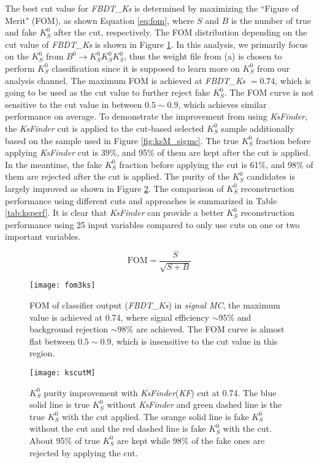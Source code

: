 The best cut value for \textit{FBDT\_Ks} is determined by maximizing the ``Figure of Merit" (FOM), as shown Equation \ref{eq:fom}, where $S$ and $B$ is the number of true and fake $K_S^0$ after the cut, respectively. The FOM distribution depending on the cut value of \textit{FBDT\_Ks} is shown in Figure \ref{fig:ks_fom}. In this analysis, we primarily focus on the $K_S^0$ from $B^0 \to K_S^0  K_S^0  K_S^0$, thus the weight file from (a) is chosen to perform $K_S^0$ classification since it is supposed to learn more on $K_S^0$ from our analysis channel. The maximum FOM is achieved at \textit{FBDT\_Ks} $= 0.74$, which is going to be used as the cut value to further reject fake $K_S^0$. The FOM curve is not sensitive to the cut value in between $0.5 \sim 0.9$, which achieves similar performance on average. To demonstrate the improvement from using \textit{KsFinder}, the \textit{KsFinder} cut is applied to the cut-based selected $K_S^0$ sample additionally based on the sample used in Figure \ref{fig:ksM_sigmc}.  The true $K_S^0$ fraction before applying \textit{KsFinder} cut is 39\%, and 95\% of them are kept after the cut is applied. In the meantime, the fake $K_S^0$ fraction before applying the cut is 61\%, and 98\% of them are rejected after the cut is applied. The purity of the $K_S^0$ candidates is largely improved as shown in Figure \ref{fig:ks_cutused}. The comparison of $K_S^0$ reconstruction performance using different cuts and approaches is summarized in Table \ref{tab:ksperf}.  It is clear that \textit{KsFinder} can provide a better $K_S^0$ reconstruction performance using 25 input variables compared to only use cuts on one or two important variables.

\begin{equation}\label{eq:fom}
	\text{FOM} = \frac{S}{\sqrt{S+B}}
\end{equation}

\begin{figure}[htpb]
	\centering
	\texttt{[image: fom3ks]}
	\caption{FOM of classifier output (\textit{FBDT\_Ks}) in \textit{signal MC}, the maximum value is achieved at 0.74, where signal efficiency $\sim95\%$ and background rejection $\sim 98\%$ are achieved. The FOM curve is almost flat between $0.5\sim 0.9$, which is insensitive to the cut value in this region.} 
	\label{fig:ks_fom}
\end{figure}



\begin{figure}[htpb]
	\centering
	\texttt{[image: kscutM]}
	\caption{$K_S^0$ purity improvement with \textit{KsFinder}(\textit{KF}) cut at 0.74. The blue solid line is true $K_S^0$ without \textit{KsFinder} and green dashed line is the true $K_S^0$ with the cut applied. The orange solid line is fake $K_S^0$ without the cut and the red dashed line is fake $K_S^0$ with the cut. About 95\% of true $K_S^0$ are kept while 98\% of the fake ones are rejected by applying the cut.}
	\label{fig:ks_cutused}
\end{figure}

